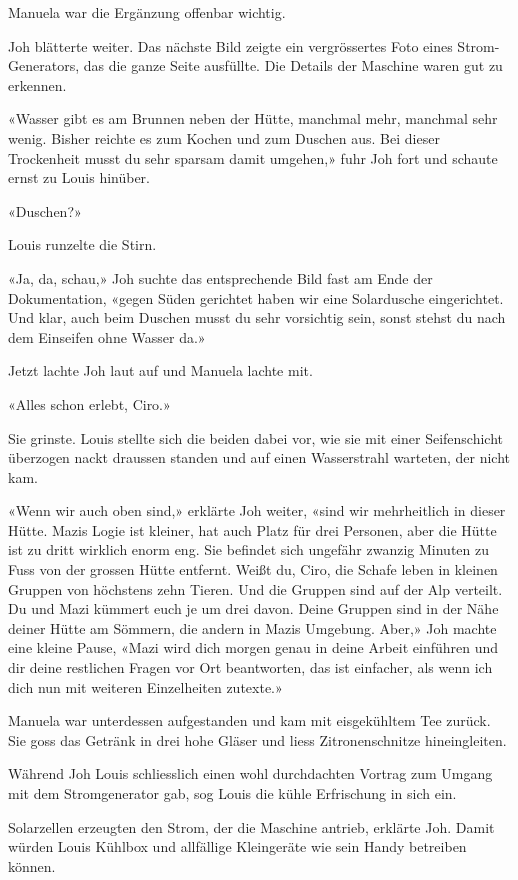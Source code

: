 Manuela war die Ergänzung offenbar wichtig.

Joh blätterte weiter. Das nächste Bild zeigte ein vergrössertes Foto
eines Strom-Generators, das die ganze Seite ausfüllte. Die Details der
Maschine waren gut zu erkennen.

«Wasser gibt es am Brunnen neben der Hütte, manchmal mehr, manchmal sehr
wenig. Bisher reichte es zum Kochen und zum Duschen aus. Bei dieser
Trockenheit musst du sehr sparsam damit umgehen,» fuhr Joh fort und
schaute ernst zu Louis hinüber.

«Duschen?»

Louis runzelte die Stirn.

«Ja, da, schau,» Joh suchte das entsprechende Bild fast am Ende der
Dokumentation, «gegen Süden gerichtet haben wir eine Solardusche
eingerichtet. Und klar, auch beim Duschen musst du sehr vorsichtig sein,
sonst stehst du nach dem Einseifen ohne Wasser da.»

Jetzt lachte Joh laut auf und Manuela lachte mit.

«Alles schon erlebt, Ciro.»

Sie grinste. Louis stellte sich die beiden dabei vor, wie sie mit einer
Seifenschicht überzogen nackt draussen standen und auf einen
Wasserstrahl warteten, der nicht kam.

«Wenn wir auch oben sind,» erklärte Joh weiter, «sind wir mehrheitlich
in dieser Hütte. Mazis Logie ist kleiner, hat auch Platz für drei
Personen, aber die Hütte ist zu dritt wirklich enorm eng. Sie befindet
sich ungefähr zwanzig Minuten zu Fuss von der grossen Hütte entfernt.
Weißt du, Ciro, die Schafe leben in kleinen Gruppen von höchstens zehn
Tieren. Und die Gruppen sind auf der Alp verteilt. Du und Mazi kümmert
euch je um drei davon. Deine Gruppen sind in der Nähe deiner Hütte am
Sömmern, die andern in Mazis Umgebung. Aber,» Joh machte eine kleine
Pause, «Mazi wird dich morgen genau in deine Arbeit einführen und dir
deine restlichen Fragen vor Ort beantworten, das ist einfacher, als wenn
ich dich nun mit weiteren Einzelheiten zutexte.»

Manuela war unterdessen aufgestanden und kam mit eisgekühltem Tee
zurück. Sie goss das Getränk in drei hohe Gläser und liess
Zitronenschnitze hineingleiten.

Während Joh Louis schliesslich einen wohl durchdachten Vortrag zum
Umgang mit dem Stromgenerator gab, sog Louis die kühle Erfrischung in
sich ein.

Solarzellen erzeugten den Strom, der die Maschine antrieb, erklärte Joh.
Damit würden Louis Kühlbox und allfällige Kleingeräte wie sein Handy
betreiben können.

